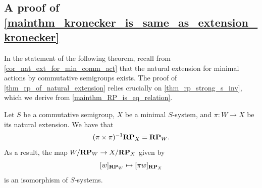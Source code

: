 \subsection{A proof of \cref{mainthm_kronecker_is_same_as_extension_kronecker}}
\label{sec_proof_of_same_kron}

In the statement of the following theorem, recall from \cref{cor_nat_ext_for_min_comm_act} that the natural extension for minimal actions by commutative semigroups exists.
The proof of \cref{thm_rp_of_natural_extension} relies crucially on \cref{thm_rp_strong_s_inv}, which we derive from \cref{mainthm_RP_is_eq_relation}.

\begin{theorem}
\label{thm_rp_of_natural_extension}
    Let $S$ be a commutative semigroup, $X$ be a minimal $S$-system, and $\pi: W \to X$ be its natural extension. We have that
    \[
        (\pi \times \pi)^{-1} \mathbf{RP}_X = \mathbf{RP}_W.
    \]
    As a result, the map $W/ \mathbf{RP}_W \to X / \mathbf{RP}_X$ given by 
    \[[w]_{\mathbf{RP}_W} \mapsto [\pi w]_{\mathbf{RP}_X}\]
    is an isomorphism of $S$-systems.
\end{theorem}

